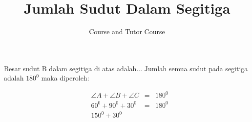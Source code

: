 \documentclass[12pt, border=5mm]{article}
\begin{document}
\title{Jumlah Sudut Dalam Segitiga}
\author{Course and Tutor Course}
\maketitle


Besar sudut B dalam segitiga di atas adalah...\newline
Jumlah semua sudut pada segitiga adalah $180^{0}$ maka diperoleh:

$$
\begin{aligned}
&\angle{A}+\angle{B}+\angle{C} & = & 180^{0} \\
&60^{0}+90^{0}+30^{0} & = & 180^{0} \\
&150^{0}+30^{0}
\end{aligned}
$$
\end{document}
